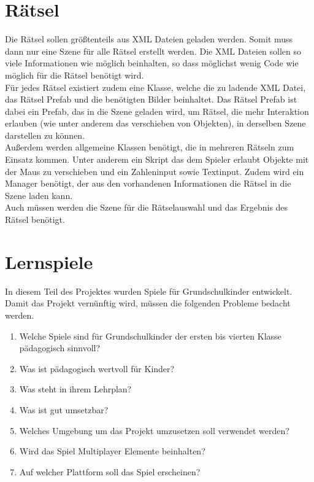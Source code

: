 \section{Rätsel}
Die Rätsel sollen größtenteils aus XML Dateien geladen werden. Somit muss dann nur eine Szene für alle Rätsel erstellt werden. Die XML Dateien sollen so viele Informationen wie möglich beinhalten, so dass möglichst wenig Code wie möglich für die Rätsel benötigt wird. \\
Für jedes Rätsel existiert zudem eine Klasse, welche die zu ladende XML Datei, das Rätsel Prefab und die benötigten Bilder beinhaltet. Das Rätsel Prefab ist dabei ein Prefab, das in die Szene geladen wird, um Rätsel, die mehr Interaktion erlauben (wie unter anderem das verschieben von Objekten), in derselben Szene darstellen zu können. \\
Außerdem werden allgemeine Klassen benötigt, die in mehreren Rätseln zum Einsatz kommen. Unter anderem ein Skript das dem Spieler erlaubt Objekte mit der Maus zu verschieben und ein Zahleninput sowie Textinput. Zudem wird ein Manager benötigt, der aus den vorhandenen Informationen die Rätsel in die Szene laden kann.\\
Auch müssen werden die Szene für die Rätselauswahl und das Ergebnis des Rätsel benötigt.

\section{Lernspiele}

In diesem Teil des Projektes wurden Spiele für Grundschulkinder entwickelt. Damit das Projekt vernünftig wird, müssen die folgenden Probleme bedacht werden.
\begin{enumerate}
    \item Welche Spiele sind für Grundschulkinder der ersten bis vierten Klasse pädagogisch sinnvoll?
    \item Was ist pädagogisch wertvoll für Kinder?
    \item Was steht in ihrem Lehrplan?
    \item Was ist gut umsetzbar?
    \item Welches Umgebung um das Projekt umzusetzen soll verwendet werden?
    \item Wird das Spiel Multiplayer Elemente beinhalten?
    \item Auf welcher Plattform soll das Spiel erscheinen?
\end{enumerate}

